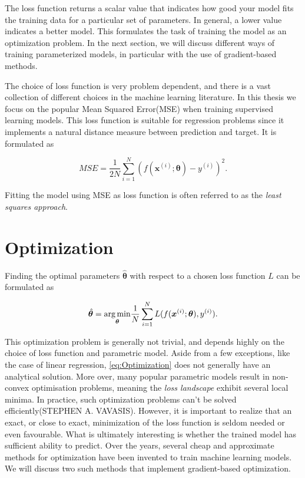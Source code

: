 The loss function returns a scalar value that indicates how good your model fits the training data for a particular set of parameters. In general, a lower value indicates a better model. This formulates the task of training the model as an optimization problem. In the next section, we will discuss different ways of training parameterized models, in particular with the use of gradient-based methods.

The choice of loss function is very problem dependent, and there is a vast collection of different choices in the machine learning literature\citet{hastie01statisticallearning}. In this thesis we focus on the popular Mean Squared Error(MSE) when training supervised learning models. This loss function is suitable for regression problems since it implements a natural distance measure between prediction and target. It is formulated as

\begin{equation}\label{eq:MSE}
    MSE = \frac{1}{2N}\sum_{i=1}^{N} (f(\boldsymbol{x}^{(i)}; \boldsymbol{\theta}) - y^{(i)})^2.
\end{equation}

Fitting the model using MSE as loss function is often referred to as the \emph{least squares approach}.




\section{Optimization}\label{sec:Optimization}
Finding the optimal parameters $\hat{\boldsymbol{\theta}}$ with respect to a chosen loss function $L$ can be formulated as

\begin{equation}\label{eq:Optimization}
    \hat{\boldsymbol{\theta}} = \underset{\boldsymbol{\theta}}{\operatorname*{arg\,min}} \frac{1}{N}\sum_{i=1}^{N} L(f(\boldsymbol{x}^{(i)}; \boldsymbol{\theta}) , y^{(i)}).
\end{equation}

This optimization problem is generally not trivial, and depends highly on the choice of loss function and parametric model. Aside from a few exceptions, like the case of linear regression, \autoref{eq:Optimization} does not generally have an analytical solution. More over, many popular parametric models result in non-convex optimisation problems, meaning the \emph{loss landscape} exhibit several local minima. In practice, such optimization problems can't be solved efficiently(STEPHEN A. VAVASIS). However, it is important to realize that an exact, or close to exact, minimization of the loss function is seldom needed or even favourable. What is ultimately interesting is whether the trained model has sufficient ability to predict. Over the years, several cheap and approximate methods for optimization have been invented to train machine learning models. We will discuss two such methods that implement gradient-based optimization. 

